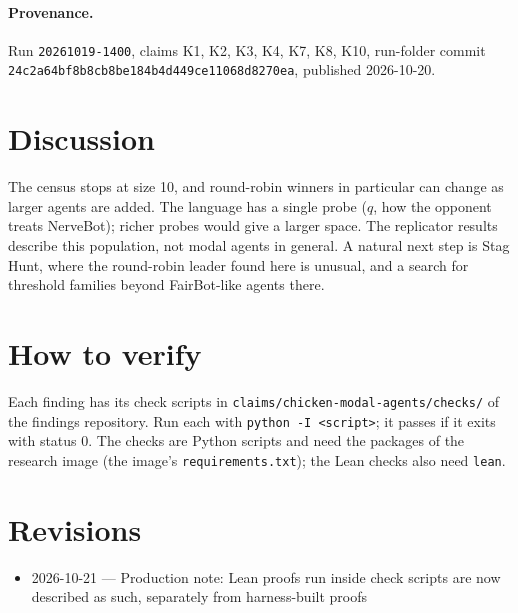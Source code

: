\documentclass{article}
\begin{document}
\paragraph{Provenance.}
Run \texttt{20261019-1400}, claims K1, K2, K3, K4, K7, K8, K10, run-folder commit \texttt{24c2a64bf8b8cb8be184b4d449ce11068d8270ea}, published 2026-10-20.

\section{Discussion}

The census stops at size 10, and round-robin winners in particular can change as larger agents
are added. The language has a single probe ($q$, how the opponent treats NerveBot); richer probes
would give a larger space. The replicator results describe this population, not modal agents in
general. A natural next step is Stag Hunt, where the round-robin leader found here is unusual, and
a search for threshold families beyond FairBot-like agents there.

\section{How to verify}

Each finding has its check scripts in \texttt{claims/chicken-modal-agents/checks/} of the findings repository. Run each with \texttt{python -I <script>}; it passes if it exits with status 0. The checks are Python scripts and need the packages of the research image (the image's \texttt{requirements.txt}); the Lean checks also need \texttt{lean}.

\section{Revisions}

\begin{itemize}
\item 2026-10-21 --- Production note: Lean proofs run inside check scripts are now described as such, separately from harness-built proofs
\end{itemize}



\end{document}
